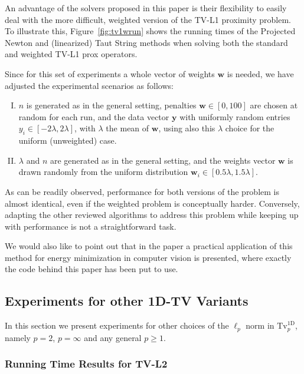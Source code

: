 \documentclass[twoside,11pt]{article}
\newcommand{\vw}{\bm{w}}       \newcommand{\vwh}{\hat{\bm{w}}}        \newcommand{\wh}{\hat{w}}    \newcommand{\vwt}{\tilde{\bm{w}}}       \newcommand{\wt}{\tilde{w}}
\newcommand{\vy}{\bm{y}}       \newcommand{\vyh}{\hat{\bm{y}}}        \newcommand{\yh}{\hat{y}}    \newcommand{\vyt}{\tilde{\bm{y}}}       \newcommand{\yt}{\tilde{y}}
\newcommand{\tvell}{\text{Tv}}
\newcommand{\oned}{\text{1D}}
\numberwithin{equation}{section}
\numberwithin{theorem}{section}
\begin{document}
An advantage of the solvers proposed in this paper is their flexibility to easily deal with the more difficult, weighted version of the TV-L1 proximity problem. To illustrate this, Figure~\ref{fig:tv1wrun} shows the running times of the Projected Newton and (linearized) Taut String methods when solving both the standard and weighted TV-L1 prox operators.

Since for this set of experiments a whole vector of weights $\vw$ is needed, we have adjusted the experimental scenarios as follows:\vspace*{-5pt}
\begin{enumerate}[I)]
  \setlength{\itemsep}{1pt}
 \item $n$ is generated as in the general setting, penalties $\vw \in [0,100]$ are chosen at random for each run, and the data vector $\vy$ with uniformly random entries $y_i \in [-2 \lambda, 2 \lambda]$, with $\lambda$ the mean of $\vw$, using also this $\lambda$ choice for the uniform (unweighted) case.
 \item $\lambda$ and $n$ are generated as in the general setting, and the weights vector $\vw$ is drawn randomly from the uniform distribution $\vw_i \in [0.5 \lambda, 1.5 \lambda]$.
\end{enumerate}

As can be readily observed, performance for both versions of the problem is almost identical, even if the weighted problem is conceptually harder. Conversely, adapting the other reviewed algorithms to address this problem while keeping up with performance is not a straightforward task.

We would also like to point out that in the paper \cite{Kumar15} a practical application of this method for energy minimization in computer vision is presented, where exactly the code behind this paper has been put to use.

\subsection{Experiments for other 1D-TV Variants}
\label{sec:expothertv1d}

In this section we present experiments for other choices of the $\ell_p$ norm in $\tvell_p^{\oned}$, namely $p=2$, $p=\infty$ and any general $p \geq 1$.

\subsubsection{Running Time Results for TV-L2}
\label{sec:exptvl2}
\end{document}
